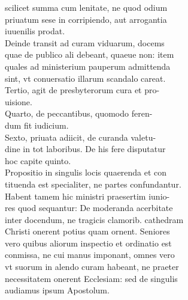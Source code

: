 \documentclass{article}
\begin{document}
\begin{pages}
                scilicet summa cum lenitate, ne quod odium \\
                priuatum sese in corripiendo, aut arrogantia \\
                iuuenilis prodat. \\
                Deinde transit ad curam viduarum, docems \\
                quae de publico ali debeant, quaeue non: item \\
                quales ad ministerium pauperum admittenda \\
                sint, vt conuersatio illarum scandalo careat. \\
                Tertio, agit de presbyterorum cura et pro- \\
                uisione. \\
                Quarto, de peccantibus, quomodo feren- \\
                dum fit iudicium. \\
                Sexto, priuata adiicit, de curanda valetu- \\
                dine in tot laboribus. De his fere disputatur \\
                hoc capite quinto. \\
                Propositio in singulis locis quaerenda et con \\
                tituenda est specialiter, ne partes confundantur. \\
                Habent tamem hic ministri praesertim iunio- \\
                res quod sequantur: De moderanda acerbitate \\
                inter docendum, ne tragicis clamorib. cathedram \\
                Christi onerent potius quam ornent. Seniores \\
                vero quibus aliorum inspectio et ordinatio est \\
                conmissa, ne cui manus imponant, omnes vero \\
                vt suorum in alendo curam habeant, ne praeter \\
                necessitatem onerent Ecclesiam: sed de singulis \\
                audiamus ipsum Apostolum. \\

\end{pages}
\end{document}

